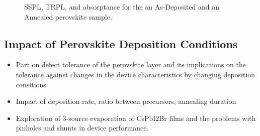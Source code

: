 \begin{figure}[htbp]
\begin{subfigure}[t]{0.45\textwidth}
        \caption{}
        \label{fig:ch2:annealed_eqe}
    \end{subfigure}
    \caption{SSPL, TRPL, and absorptance for the an As-Deposited and an Annealed perovskite sample.}
\end{figure}


\subsection{Impact of Perovskite Deposition Conditions}

\begin{itemize}
    \item Part on defect tolerance of the perovskite layer and its implications on the tolerance against changes in the device characteristics by changing deposition consitions
    \item Impact of deposition rate, ratio between precursors, annealing duration
    \item Exploration of 3-source evaporation of CsPbI2Br films and the problems with pinholes and shunts in device performance. 
\end{itemize}

